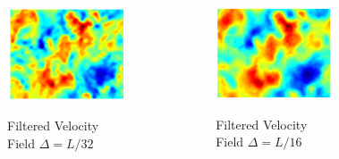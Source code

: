 \documentclass{beamer}
\begin{document}
\begin{frame}
\begin{columns}[T]
\begin{column}{0.3\textwidth}
\begin{figure}[c]
\begin{center}
		DNS Velocity Field
	\end{center}
\end{figure}
\end{column}
\begin{column}{0.3\textwidth}
\begin{figure}[c]
	\begin{center}
		\includegraphics[width=\textwidth]{DNS_Filtered_Velocity_Field_Small.png}

		Filtered Velocity Field $\Delta=L/32$
	\end{center}
\end{figure}
\end{column}
\begin{column}{0.3\textwidth}
\begin{figure}[c]
	\begin{center}
		\includegraphics[width=\textwidth]{DNS_Filtered_Velocity_Field_Large.png}

		Filtered Velocity Field $\Delta=L/16$
	\end{center}
\end{figure}
\end{column}
\end{columns}
\end{frame}
\end{document}
